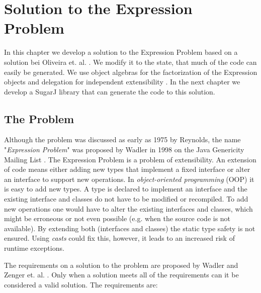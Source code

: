 \documentclass{report}
\begin{document}
\chapter{Solution to the Expression Problem}

In this chapter we develop a solution to the Expression Problem based on a solution bei Oliveira et. al. \cite{Oliv-Extensibility-2012}. We modify it to the state, that much of the code can easily be generated. We use object algebras for the factorization of the Expression objects and delegation for independent extensibility \cite{Tempero-Multiple-2000}. In the next chapter we develop a SugarJ library that can generate the code to this solution.


\section{The Problem}
\label{theProblem}

Although the problem was discussed as early as 1975 by Reynolds, the name "\emph{Expression Problem}" was proposed by Wadler in 1998 on the Java Genericity Mailing List \cite{Reynolds-Abstraction-1975, Wadler-Expression-1998}. The Expression Problem is a problem of extensibility. An extension of code means either adding new types that implement a fixed interface or alter an interface to support new operations. In \emph{object-oriented programming} (OOP) it is easy to add new types. A type is declared to implement an interface and the existing interface and classes do not have to be modified or recompiled. To add new operations one would have to alter the existing interfaces and classes, which might be erroneous or not even possible (e.g. when the source code is not available). By extending both (interfaces and classes) the static type safety is not ensured. Using \emph{casts} could fix this, however, it leads to an increased risk of runtime exceptions.

The requirements on a solution to the problem are proposed by Wadler and Zenger et. al. \cite{Wadler-Expression-1998, Odersky-Expression-2005, Oliv-Extensibility-2012}. Only when a solution meets all of the requirements can it be considered a valid solution. The requirements are:
\end{document}
